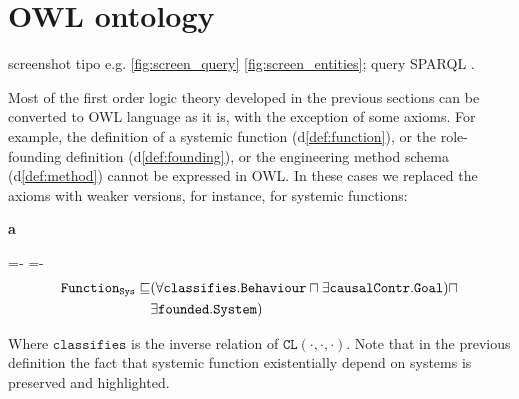 \documentclass[sw]{iosart2x}
\newcommand{\bflist}{\begin{list}{}{\setlength{\topsep}{2mm}\setlength{\partopsep}{0mm}\setlength{\parsep}{0mm}\setlength{\leftmargin}{9mm}\setlength{\labelwidth}{8mm}}}
\newcommand{\eflist}{\end{list}}
\newcommand{\AxLabel}{\textrm{a}}
\newcommand{\DefLabel}{\textrm{d}}
\newcounter{cntax}
\newcommand{\myax}[1]{\refstepcounter{cntax}\begin{small}{\bf \AxLabel\thecntax\label{ax:#1}}\end{small}}
\newcommand{\refdf}[1]{({\DefLabel}\ref{#1})}
\newcommand{\generalStyle}[1]{\texttt{#1}}
\newcommand{\triRel}[4]{\generalStyle{#1}(#2,#3,#4)}
\newcommand{\OWL}{\textnormal{OWL}\xspace}
\newcommand{\DOLCECLby}[3]{\triRel{CL}{#1}{#2}{#3}}
\newcommand{\BehaviourConcreteNullary}{\generalStyle{Behaviour}}
\newcommand{\GoalNullary}{\generalStyle{Goal}}
\newcommand{\SystemNullary}{\generalStyle{System}}
\newcommand{\FunctionSysNullary}{\generalStyle{Function}_{\generalStyle{Sys}}}
\newcommand{\foundedNullary}{\generalStyle{\foundedTerm{passive}}}
\newcommand{\causallyContrNullary}{\generalStyle{causalContr}}
\newcommand{\foundedTerm}[1]{%
  \ifthenelse{\equal{#1}{passive}}{founded}{%
    \ifthenelse{\equal{#1}{verb}}{found}{%
      \ifthenelse{\equal{#1}{gerund}}{founding}{%
        ERROR!%
      }%
    }%
  }%
}
\newcommand{\myalignspaceskip}{
 \abovedisplayskip=-\baselineskip
 \belowdisplayskip=0pt
 \abovedisplayshortskip=-\baselineskip
 \belowdisplayshortskip=0pt}
\newcommand{\TODO}[1]{{\color{red} #1}}
\newcommand{\TODOinline}[1]{{\color{red} #1}}
\begin{document}










\section{OWL ontology}\label{sec:appendice}
\TODO{%
screenshot tipo e.g. \ref{fig:screen_query} \ref{fig:screen_entities}; %
query SPARQL%
.}

\medskip
Most of the first order logic theory developed in the previous sections can be converted to \OWL language as it is, with the exception of some axioms.
For example, the definition of a systemic function \refdf{def:function}, or the role-founding definition \refdf{def:founding}, or the engineering method schema \refdf{def:method} cannot be expressed in \OWL. 
In these cases we replaced the axioms with weaker versions, for instance, for systemic functions:
\bflist
\item[\myax{functionOWL}] 
\myalignspaceskip
\setlength{\jot}{0pt}%
\begin{align*}
    \FunctionSysNullary\sqsubseteq &
    (\forall\mathtt{classifies}.\BehaviourConcreteNullary \sqcap \exists\causallyContrNullary.\GoalNullary) 
        \sqcap \\ & \exists\foundedNullary.\SystemNullary)
\end{align*}
\eflist
Where $\mathtt{classifies}$ is the inverse relation of $\DOLCECLby{\cdot}{\cdot}{\cdot}$. Note that in the previous definition the fact that systemic function existentially depend on systems is preserved and highlighted.
\end{document}
